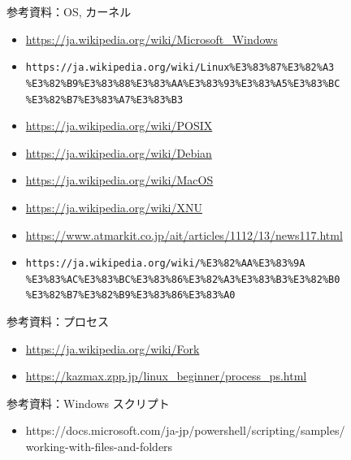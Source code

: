 \documentclass[12pt,aspectratio=169]{beamer}
\begin{document}
\begin{frame}{参考資料：OS, カーネル}
  \begin{itemize}
    \item \url { https://ja.wikipedia.org/wiki/Microsoft_Windows }
    \item \texttt {https://ja.wikipedia.org/wiki/Linux\%E3\%83\%87\%E3\%82\%A3 \\ \%E3\%82\%B9\%E3\%83\%88\%E3\%83\%AA\%E3\%83\%93\%E3\%83\%A5\%E3\%83\%BC \\ \%E3\%82\%B7\%E3\%83\%A7\%E3\%83\%B3 }
    \item \url { https://ja.wikipedia.org/wiki/POSIX }
    \item \url { https://ja.wikipedia.org/wiki/Debian }
    \item \url { https://ja.wikipedia.org/wiki/MacOS }
    \item \url { https://ja.wikipedia.org/wiki/XNU }
    \item \url { https://www.atmarkit.co.jp/ait/articles/1112/13/news117.html }
    \item \texttt {https://ja.wikipedia.org/wiki/\%E3\%82\%AA\%E3\%83\%9A \\ \%E3\%83\%AC\%E3\%83\%BC\%E3\%83\%86\%E3\%82\%A3\%E3\%83\%B3\%E3\%82\%B0 \\ \%E3\%82\%B7\%E3\%82\%B9\%E3\%83\%86\%E3\%83\%A0 }
  \end{itemize}

\end{frame}

\begin{frame}{参考資料：プロセス}
  \begin{itemize}
    \item \url { https://ja.wikipedia.org/wiki/Fork }
    \item \url { https://kazmax.zpp.jp/linux_beginner/process_ps.html }
  \end{itemize}

\end{frame}


\begin{frame}{参考資料：Windows スクリプト}
  \begin{itemize}
    \item https://docs.microsoft.com/ja-jp/powershell/scripting/samples/\\ working-with-files-and-folders
  \end{itemize}

\end{frame}
\end{document}
